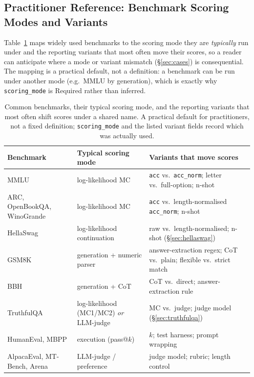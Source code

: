 \documentclass[11pt]{article}
\begin{document}
\subsection{Practitioner Reference: Benchmark Scoring Modes and Variants}
\label{app:scoring-ref}
Table~\ref{tab:scoring-ref} maps widely used benchmarks to the scoring mode they
are \emph{typically} run under and the reporting variants that most often move
their scores, so a reader can anticipate where a mode or variant mismatch
(\S\ref{sec:cases}) is consequential. The mapping is a practical default, not a
definition: a benchmark can be run under another mode (e.g.\ MMLU by generation),
which is exactly why \texttt{scoring\_mode} is Required rather than inferred.

\begin{table}[t]
\centering\small
\begin{tabular}{@{}p{}p{}p{}@{}}
\toprule
\textbf{Benchmark} & \textbf{Typical scoring mode} & \textbf{Variants that move scores} \\
\midrule
MMLU & log-likelihood MC & \texttt{acc} vs.\ \texttt{acc\_norm}; letter vs.\ full-option; n-shot \\
ARC, OpenBookQA, WinoGrande & log-likelihood MC & \texttt{acc} vs.\ length-normalised \texttt{acc\_norm}; n-shot \\
HellaSwag & log-likelihood continuation & raw vs.\ length-normalised; n-shot (\S\ref{sec:hellaswag}) \\
GSM8K & generation + numeric parser & answer-extraction regex; CoT vs.\ plain; flexible vs.\ strict match \\
BBH & generation + CoT & CoT vs.\ direct; answer-extraction rule \\
TruthfulQA & log-likelihood (MC1/MC2) \emph{or} LLM-judge & MC vs.\ judge; judge model (\S\ref{sec:truthfulqa}) \\
HumanEval, MBPP & execution (pass@$k$) & $k$; test harness; prompt wrapping \\
AlpacaEval, MT-Bench, Arena & LLM-judge / preference & judge model; rubric; length control \\
\bottomrule
\end{tabular}
\caption{Common benchmarks, their typical scoring mode, and the reporting variants
that most often shift scores under a shared name. A practical default for
practitioners, not a fixed definition; \texttt{scoring\_mode} and the listed
variant fields record which was actually used.}
\label{tab:scoring-ref}
\end{table}
\end{document}
